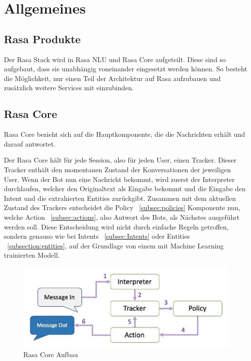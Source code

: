 \section{Allgemeines}\label{sec:overview}

\subsection{Rasa Produkte}\label{sec:rasa-products}

Der Rasa Stack wird in Rasa NLU und Rasa Core aufgeteilt.
Diese sind so aufgebaut, dass sie unabhängig voneinander eingesetzt werden können.
So besteht die Möglichkeit, nur einen Teil der Architektur auf Rasa aufzubauen und zusätzlich weitere Services mit einzubinden.

\subsection{Rasa Core}\label{subsec:rasa-core}

Rasa Core bezieht sich auf die Hauptkomponente, die die Nachrichten erhält und darauf antwortet.\cite{rasaCore}

Der Rasa Core hält für jede Session, also für jeden User, einen Tracker.
Dieser Tracker enthält den momentanen Zustand der Konversationen der jeweiligen User.
Wenn der Bot nun eine Nachricht bekommt, wird zuerst der Interpreter durchlaufen, welcher den Originaltext als Eingabe bekommt und die Eingabe den Intent und die extrahierten Entities zurückgibt.
Zusammen mit dem aktuellen Zustand des Trackers entscheidet die Policy ~\ref{subsec:policies} Komponente nun, welche Action ~\ref{subsec:actions}, also Antwort des Bots, als Nächstes ausgeführt werden soll.
Diese Entscheidung wird nicht durch einfache Regeln getroffen, sondern genauso wie bei Intents ~\ref{subsec:Intents} oder Entities ~\ref{subsection:entities}, auf der Grundlage von einem mit Machine Learning trainierten Modell.\cite{rasaCore, rasaCoreBook}

\begin{figure}[hbt!]
    \centering
    \includegraphics[scale=0.5]{pics/rasa-core}
    \caption{Rasa Core Aufbau~\cite{rasaCoreBook}}
    \label{fig:rasa_core}
\end{figure}

